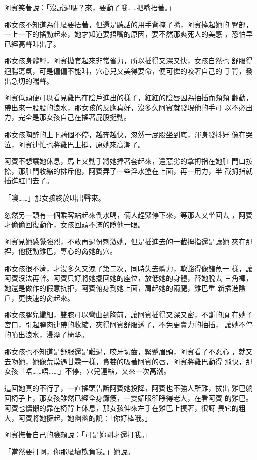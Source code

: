 阿賓笑著說：「沒試過嗎？來，要動了哦……把嘴捂著。」

那女孩不知道為什麼要捂著，但還是聽話的用手背掩了嘴，阿賓捧起她的
臀部，一上一下的搖動起來，她才知道要捂嘴的原因，要不然那爽死人的美感
，恐怕早已經高聲叫出了。

那女孩身體輕，阿賓拋套起來非常省力，所以插得又深又快，女孩自然也
舒服得迴腸蕩氣，可是偏偏不能叫，穴心兒又美得要命，便可憐的咬著自己的
手背，發出急切的喘聲。

阿賓低頭便可以看見雞巴在陰戶進出的樣子，紅紅的陰唇因為抽插而頻頻
翻動，帶出來一股股的浪水，那女孩的反應真好，沒多久阿賓就發現他的手可
以不必出力，完全是那女孩自己在搖著屁股挺動。

那女孩陶醉的上下騎個不停，越奔越快，忽然一屁股坐到底，渾身發抖好
像在哭泣，阿賓連忙也將雞巴上挺，原她來高潮了。

阿賓不想讓她休息，馬上又動手將她捧著套起來，還惡劣的拿拇指在她肛
門口按捺，那肛門收縮的排斥他，阿賓弄了一些淫水塗在上面，再一用力，半
截拇指就插進肛門去了。

「噢……」那女孩終於叫出聲來。

忽然另一頭有一個乘客站起來倒水喝，倆人趕緊停下來，等那人又坐回去
，阿賓才偷偷回復動作，女孩回頭不滿的瞪他一眼。

阿賓見她感覺強烈，不敢再過份刺激她，但是插進去的一截拇指還是讓她
夾在那裡，他挺動雞巴，專心的肏她的穴。

那女孩很不濟，才沒多久又洩了第二次，同時失去體力，軟豁得像鱔魚一
樣，讓阿賓沒法再幹。阿賓只好將她擺回她的座位，放低她的身體，替她脫去
三角褲，她還是做作的假意抗拒，阿賓俯身到她上面，肩起她的兩腿，雞巴重
新插進陰戶，更快速的肏起來。

那女孩腿兒纖細，雙膝可以彎曲到胸前，讓阿賓插得又深又密，不斷的頂
在她子宮口，引起膣肉連帶的收縮，夾得阿賓舒服透了，不免更賣力的抽插，
讓她不停的噴出浪水，浸溼了椅墊。

那女孩也不知道是舒服還是難過，咬牙切齒，緊蹙眉頭，阿賓看了不忍心
，就又去吻她，她像荒漠遇甘霖一樣，貪婪的吸著阿賓的唇，阿賓將雞巴動得
飛快，那女孩「唔……唔……」不停，穴兒連縮，又來一次高潮。

這回她真的不行了，一直搖頭告訴阿賓她投降，阿賓也不強人所難，拔出
雞巴躺回椅子上，那女孩雖然已經全身癱瘓，一雙媚眼卻睜得老大，在看阿賓
的雞巴。阿賓也慵懶的靠在椅背上休息，那女孩伸來左手在雞巴上摸著，很訝
異它的粗大，阿賓將她擁起，她幽幽的說：「你好棒哦。」

阿賓撫著自己的臉頰說：「可是妳剛才還打我。」

「當然要打啊，你那麼壞欺負我。」她說。


